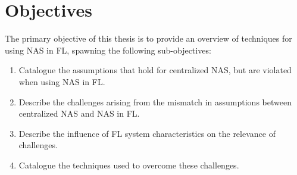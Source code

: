 \section{Objectives}\label{sec:objectives}

The primary objective of this thesis is to provide an overview of techniques for using NAS in FL, spawning the following sub-objectives: 
\begin{enumerate}
    \item Catalogue the assumptions that hold for centralized NAS, but are violated when using NAS in FL.
    \item Describe the challenges arising from the mismatch in assumptions between centralized NAS and NAS in FL.
    \item Describe the influence of FL system characteristics on the relevance of challenges.
    \item Catalogue the techniques used to overcome these challenges.
\end{enumerate}
